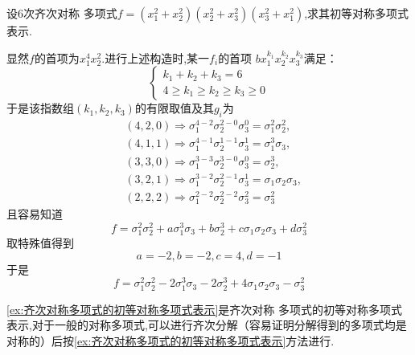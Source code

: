 \begin{brown}
\begin{example}\label{ex:齐次对称多项式的初等对称多项式表示}
    设$6$次齐次对称
    多项式$f=\left(
        x_1^2+x_2^2
    \right)\left(
        x_2^2+x_3^2
    \right)\left(
        x_3^2+x_1^2
    \right)$,求其初等对称多项式表示.
\end{example}
\begin{solution}
显然$f$的首项为$x_1^4x_2^2$.进行上述构造时,某一$f_i$的首项
    $bx_1^{k_1}x_2^{k_2}x_3^{k_3}$满足：
    \[
    \begin{cases*}
    k_1+    k_2+k_3=6\\
    4\geqslant k_1\geqslant k_2\geqslant k_3\geqslant 0
    \end{cases*}
    \]
    于是该指数组$\left(
        k_1,k_2,k_3
    \right)$的有限取值及其$g_i$为
    \begin{align*}
       & \left(
        4,2,0
    \right)\Longrightarrow
    \sigma_1^{4-2}\sigma_2^{2-0}\sigma_3^{0}=
    \sigma_1^2
    \sigma_2^2,\\
    &\left(4,1,1\right) \Longrightarrow
    \sigma_1^{4-1}\sigma_2^{1-1}\sigma_3^{1}=
    \sigma_1^3\sigma_3,\\
    &\left(
        3,3,0   
    \right)
    \Longrightarrow
    \sigma_1^{3-3}\sigma_2^{3-0}\sigma_3^{0}=
    \sigma_2^3,\\
    &\left(
        3,2,1
    \right)
    \Longrightarrow
    \sigma_1^{3-2}\sigma_2^{2-1}\sigma_3^{1}=
    \sigma_1\sigma_2\sigma_3,\\
    &\left(
        2,2,2
    \right) \Longrightarrow
    \sigma_1^{2-2}\sigma_2^{2-2}\sigma_3^{2}=
    \sigma_3^2 
    \end{align*}
    且容易知道
    \[
    f=\sigma_1^2\sigma_2^2+a\sigma_1^3\sigma_3+b\sigma_2^3+c\sigma_1\sigma_2\sigma_3+d\sigma_3^2
    \]取特殊值得到
    \[
    a=-2,b=-2,c=4,d=-1
    \]
    于是
    \[
    f  =\sigma_1^2\sigma_2^2-2\sigma_1^3\sigma_3-2\sigma_2^3+4\sigma_1\sigma_2\sigma_3-\sigma_3^2
    \]
\end{solution}
\end{brown}
\begin{red}
\begin{remark}
    \cref{ex:齐次对称多项式的初等对称多项式表示}是齐次对称
    多项式的初等对称多项式表示,对于一般的对称多项式,可以进行齐次分解（容易证明分解得到的多项式均是对称的）后按\cref{ex:齐次对称多项式的初等对称多项式表示}方法进行.
\end{remark}
\end{red}
